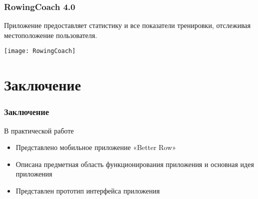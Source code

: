 \documentclass[10pt,utf8,presentation,notheorems,xcolor=dvipsnames,compress]{beamer}
\begin{document}
\begin{frame}
\frametitle{RowingCoach 4.0}
Приложение предоставляет статистику и все показатели тренировки, отслеживая местоположение пользователя.
\begin{center}
\texttt{[image: RowingCoach]}%
\end{center}
\end{frame}

\section{Заключение}
\begin{frame}
\frametitle{Заключение}
\begin{block}{В практической работе}
\begin{itemize}
 \item Представлено мобильное приложение «Better Row»
 \item Описана предметная область функционирования приложения и основная идея приложения
 \item Представлен прототип интерфейса приложения
\end{itemize}
\end{block}
\end{frame}
\end{document}
